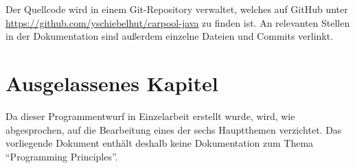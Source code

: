 Der Quellcode wird in einem Git-Repository verwaltet, welches auf GitHub unter \url{https://github.com/yschiebelhut/carpool-java} zu finden ist.
An relevanten Stellen in der Dokumentation sind außerdem einzelne Dateien und Commits verlinkt.

\section{Ausgelassenes Kapitel}
Da dieser Programmentwurf in Einzelarbeit erstellt wurde, wird, wie abgesprochen, auf die Bearbeitung eines der sechs Hauptthemen verzichtet.
Das vorliegende Dokument enthält deshalb keine Dokumentation zum Thema \enquote{Programming Principles}.